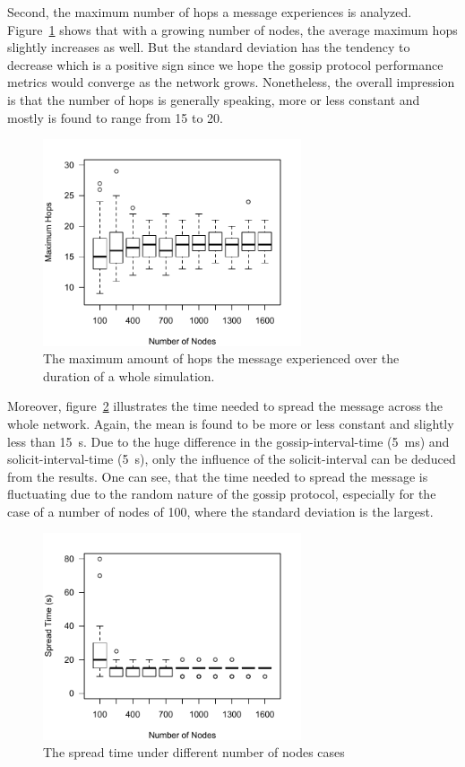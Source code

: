 \documentclass[12pt,journal]{IEEEtran}
\begin{document}
Second, the maximum number of hops a message experiences is analyzed. Figure~\ref{fig:maxhops} shows that with a growing number of nodes, the average maximum hops slightly increases as well. But the standard deviation has the tendency to decrease which is a positive sign since we hope the gossip protocol performance metrics would converge as the network grows. Nonetheless, the overall impression is that the number of hops is generally speaking, more or less constant and mostly is found to range from 15 to 20. 

\begin{figure}
	\centering
	\includegraphics[width=3in]{figs/bpHopsNodes}
	\caption{The maximum amount of hops the message experienced over the duration of a whole simulation.}
	\label{fig:maxhops}
\end{figure}

Moreover, figure~\ref{fig:maxtime} illustrates the time needed to spread the message across the whole network. Again, the mean is found to be more or less constant and slightly less than 15~s. Due to the huge difference in the gossip-interval-time (5~ms) and solicit-interval-time (5~s), only the influence of the solicit-interval can be deduced from the results. One can see, that the time needed to spread the message is fluctuating due to the random nature of the gossip protocol, especially for the case of a number of nodes of 100, where the standard deviation is the largest.

\begin{figure}
	\centering
	\includegraphics[width=3in]{figs/bpTimeNodes}
	\caption{The spread time under different number of nodes cases}
	\label{fig:maxtime}
\end{figure}
\end{document}
